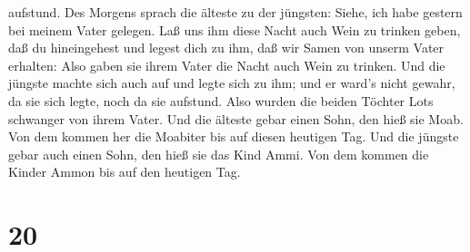 aufstund.  Des Morgens sprach die älteste zu der jüngsten:
Siehe, ich habe gestern bei meinem Vater gelegen. Laß uns ihm diese
Nacht auch Wein zu trinken geben, daß du hineingehest und legest dich zu
ihm, daß wir Samen von unserm Vater erhalten:  Also gaben
sie ihrem Vater die Nacht auch Wein zu trinken. Und die jüngste machte
sich auch auf und legte sich zu ihm; und er ward's nicht gewahr, da sie
sich legte, noch da sie aufstund.  Also wurden die beiden
Töchter Lots schwanger von ihrem Vater.  Und die älteste
gebar einen Sohn, den hieß sie Moab. Von dem kommen her die Moabiter bis
auf diesen heutigen Tag.  Und die jüngste gebar auch einen
Sohn, den hieß sie das Kind Ammi. Von dem kommen die Kinder Ammon bis
auf den heutigen Tag.

\hypertarget{section-19}{%
\section{20}\label{section-19}}


